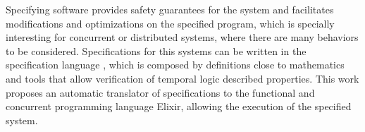 Specifying software provides safety guarantees for the system and
facilitates modifications and optimizations on the specified program, which is specially interesting for concurrent or distributed systems, where there are many behaviors to be considered. Specifications for this systems can be written in the specification language \TLAA, which is composed by definitions close to mathematics and tools that allow verification of temporal logic described properties. This work proposes an automatic translator of \TLA specifications to the functional and concurrent programming language Elixir, allowing the execution of the specified system.
